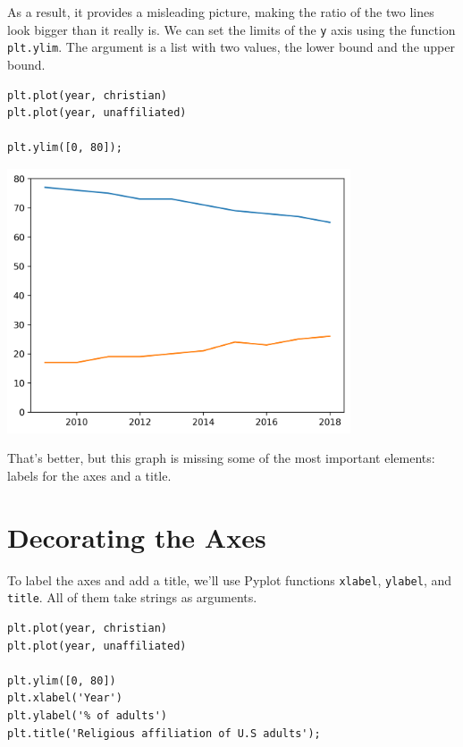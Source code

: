 As a result, it provides a misleading picture, making the ratio of the
two lines look bigger than it really is. We can set the limits of the
\passthrough{\lstinline!y!} axis using the function
\passthrough{\lstinline!plt.ylim!}. The argument is a list with two
values, the lower bound and the upper bound.

\begin{lstlisting}[]
plt.plot(year, christian)
plt.plot(year, unaffiliated)

plt.ylim([0, 80]);
\end{lstlisting}

\begin{center}
\includegraphics[width=4in]{chapters/06_plotting_files/06_plotting_26_0.png}
\end{center}

That's better, but this graph is missing some of the most important
elements: labels for the axes and a title.

\hypertarget{decorating-the-axes}{%
\section{Decorating the Axes}\label{decorating-the-axes}}

To label the axes and add a title, we'll use Pyplot functions
\passthrough{\lstinline!xlabel!}, \passthrough{\lstinline!ylabel!}, and
\passthrough{\lstinline!title!}. All of them take strings as arguments.

\begin{lstlisting}[]
plt.plot(year, christian)
plt.plot(year, unaffiliated)

plt.ylim([0, 80])
plt.xlabel('Year')
plt.ylabel('% of adults')
plt.title('Religious affiliation of U.S adults');
\end{lstlisting}


